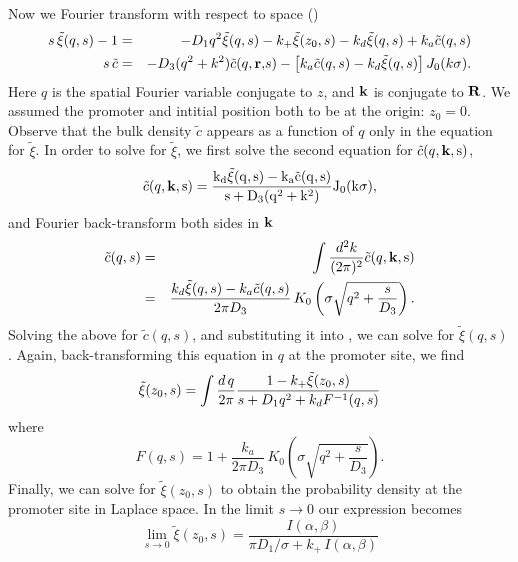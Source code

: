 Now we Fourier transform with respect to space ()
\begin{eqnarray}
 s \, \tilde{\xi}(q, s) - 1 & = & - D_1 q^2 \tilde{\xi}(q,s) - k_+ \tilde{\xi}(z_0,s) - k_d \tilde{\xi}(q,s) + k_a \tilde{c}(q, s) \elabel{FDE_dna} \\
 s \, \tilde{c} & = & - D_3 (q^2 + k^2) \tilde{c}(q, \mathbf r \mathrm, s) - \left[ k_a \tilde{c}(q, s) - k_d \tilde{\xi}(q,s) \right] J_{0}(k \sigma). 
 \elabel{FDE_bulk}
\end{eqnarray}
Here $q$ is the spatial Fourier variable conjugate to $z$, and $\bf k \rm$ is conjugate to $\bf R \bf$. We assumed the promoter and intitial position both to be at the origin: $z_0 = 0$. Observe that the bulk density $\tilde{c}$ appears as a function of $q$ only in the equation for $\tilde{\xi}$. In order to solve for $\tilde{\xi}$, we first solve the second equation for $\tilde{c}(q,\bf k \rm, s)$, 
\begin{equation}
 \tilde{c}(q,\bf k \rm, s) = \frac{k_d \tilde{\xi}(q,s) - k_a\tilde{c}(q,s)}{s + D_3(q^2 + k^2)} J_{0}(k \sigma ),
\end{equation}
and Fourier back-transform both sides in ${\bf k}$
\begin{eqnarray}
 \tilde{c}(q, s) & = & \int \frac{d^2 k}{(2 \pi)^2} \tilde{c}(q,\bf k \rm, s) \\
 & = & \frac{k_d \tilde{\xi}(q,s) - k_a\tilde{c}(q,s)}{2 \pi D_3} \, K_{0}\left( \sigma \sqrt{q^2 + \frac{s}{D_3}} \right).
\end{eqnarray}
Solving the above for $\tilde{c}(q,s)$, and substituting it into , we can solve for $\tilde{\xi}(q,s)$. Again, back-transforming this equation in $q$ at the promoter site, we find
\begin{equation}
 \tilde{\xi}(z_0, s) = \int \frac{d\,q}{2 \pi} \frac{1-k_+ \tilde{\xi}(z_0, s)}{s + D_1 q^2+k_d F^{-1}(q,s)}
 \elabel{FDE_dna2}
\end{equation}
where
\begin{equation}
F(q,s) = 1 + \frac{k_a}{2 \pi D_3} \, K_{0}\left( \sigma \sqrt{q^2 + \frac{s}{D_3}} \right).
\end{equation}
Finally, we can solve  for $\tilde{\xi}(z_0, s)$ to obtain the probability density at the promoter site in Laplace space. In the limit $s \rightarrow 0$ our expression becomes
\begin{equation}
 \lim_{s \rightarrow 0} \tilde{\xi}(z_0, s) = \frac{I(\alpha,\beta)}{\pi D_1 / \sigma + k_+ \, I(\alpha,\beta)}
\end{equation}
